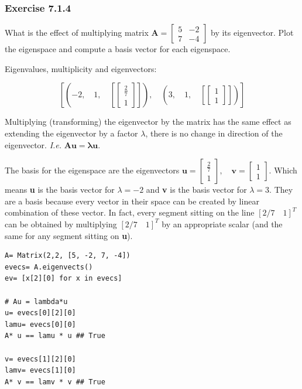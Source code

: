 \subsubsection{Exercise 7.1.4}

What is the effect of multiplying matrix $\mathbf{A}= \left[\begin{matrix}5 & -2\\7 & -4\end{matrix}\right]$ by its eigenvector. Plot the eigenspace
and compute a basis vector for each eigenspace.

Eigenvalues, multiplicity and eigenvectors:

$$
\left [ \left ( -2, \quad 1, \quad \left [ \left[\begin{matrix}\frac{2}{7}\\1\end{matrix}\right]\right ]\right ),
\quad \left ( 3, \quad 1, \quad \left [ \left[\begin{matrix}1\\1\end{matrix}\right]\right ]\right )\right ]
$$

Multiplying (transforming) the eigenvector by the matrix has the same effect as
extending the eigenvector by a factor $\lambda$, there is no change in direction
of the eigenvector. \textit{I.e.} $\mathbf{Au} = \mathbf{\lambda u}$.

The basis for the eigenspace are the eigenvectors
$\mathbf{u} = \left[\begin{matrix}\frac{2}{7}\\1\end{matrix}\right], \quad
\mathbf{v}= \left[\begin{matrix}1\\1\end{matrix}\right]$. Which means \textbf{u}
is the basis vector for $\lambda= -2$ and \textbf{v} is the basis vector for $\lambda= 3$.
They are a basis because every vector in their space can be created by linear combination
of these vector. In fact, every segment sitting on the line $[2/7 \quad 1]^T$ can be
obtained by multiplying $[2/7 \quad 1]^T$ by an appropriate scalar (and the same for any segment sitting
on \textbf{u}).

\begin{verbatim}
A= Matrix(2,2, [5, -2, 7, -4])
evecs= A.eigenvects()
ev= [x[2][0] for x in evecs]

# Au = lambda*u
u= evecs[0][2][0]
lamu= evecs[0][0]
A* u == lamu * u ## True

v= evecs[1][2][0]
lamv= evecs[1][0]
A* v == lamv * v ## True
\end{verbatim}

